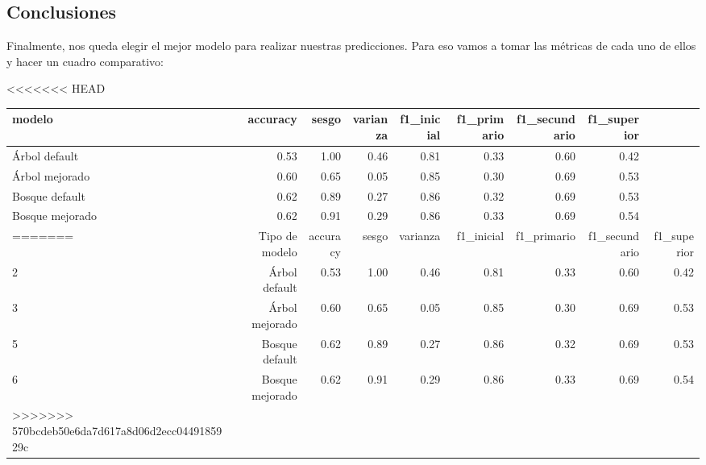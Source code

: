 \documentclass[a4paper]{article}
\begin{document}
\begin{itemize}
\newpage

\section{Conclusiones}

    Finalmente, nos queda elegir el mejor modelo para realizar nuestras predicciones. Para eso vamos a tomar las métricas de cada uno de ellos y hacer un cuadro comparativo:
    
    \begin{table}[H]
        \centering
<<<<<<< HEAD
        \begin{tabular}{|l|r|r|r|r|r|r|r|r|}
            \hline
            modelo & accuracy & sesgo & varianza & f1\_inicial & f1\_primario & f1\_secundario & f1\_superior \\ \hline
            Árbol default & 0.53 & 1.00 & 0.46 & 0.81 & 0.33 & 0.60 & 0.42 \\ \hline
            Árbol mejorado & 0.60 & 0.65 & 0.05 & 0.85 & 0.30 & 0.69 & 0.53 \\ \hline
            Bosque default & 0.62 & 0.89 & 0.27 & 0.86 & 0.32 & 0.69 & 0.53 \\ \hline
            Bosque mejorado & 0.62 & 0.91 & 0.29 & 0.86 & 0.33 & 0.69 & 0.54 \\ \hline
=======
        \begin{tabular}{ clccccccc }
            \toprule
           N° & Tipo de modelo & accuracy & sesgo & varianza & f1\_inicial & f1\_primario & f1\_secundario & f1\_superior \\ \midrule
           2  & Árbol default & 0.53 & 1.00 & 0.46 & 0.81 & 0.33 & 0.60 & 0.42 \\ 
           3  &  Árbol mejorado & 0.60 & 0.65 & 0.05 & 0.85 & 0.30 & 0.69 & 0.53 \\
           5  & Bosque default & 0.62 & 0.89 & 0.27 & 0.86 & 0.32 & 0.69 & 0.53 \\ 
           6  & Bosque mejorado & 0.62 & 0.91 & 0.29 & 0.86 & 0.33 & 0.69 & 0.54 \\
           \bottomrule
>>>>>>> 570bcdeb50e6da7d617a8d06d2ecc0449185929c
        \end{tabular}
    \end{table}


\end{itemize}
\end{document}

